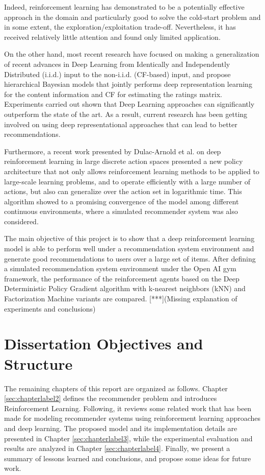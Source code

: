 Indeed, reinforcement learning has demonstrated to be a potentially effective approach in the domain and particularly good to solve the cold-start problem and in some extent, the exploration/exploitation trade-off\cite{shani2005mdp}. Nevertheless, it has received relatively little attention and found only limited application.

On the other hand, most recent research\cite{wang2015collaborative} have focused on making a generalization of recent advances in Deep Learning\cite{bengio2013representation} from Identically and Independently Distributed (i.i.d.) input to the non-i.i.d. (CF-based) input, and propose hierarchical Bayesian models that jointly performs deep representation learning for the content information and CF for estimating the ratings matrix. Experiments carried out shown that Deep Learning approaches can significantly outperform the state of the art. As a result, current research has been getting involved on using deep representational approaches that can lead to better recommendations.

Furthermore, a recent work presented by Dulac-Arnold et al. on deep reinforcement learning in large discrete action spaces\cite{Dulac-Arnold2015} presented a new policy architecture that not only allows reinforcement learning methods to be applied to large-scale learning problems, and to operate efficiently with a large number of actions, but also can generalize over the action set in logarithmic time. This algorithm showed to a promising convergence of the model among different continuous environments, where a simulated recommender system was also considered.

The main objective of this project is to show that a deep reinforcement learning model is able to perform well under a recommendation system environment and generate good recommendations to users over a large set of items. After defining a simulated recommendation system environment under the Open AI gym framework, the performance of the reinforcement agents based on the Deep Deterministic Policy Gradient algorithm with k-nearest neighbors (kNN) and Factorization Machine variants are compared. [***](Missing explanation of experiments and conclusions)

\section{Dissertation Objectives and Structure}

The remaining chapters of this report are organized as follows. Chapter \ref{sec:chapterlabel2} defines the recommender problem and introduces Reinforcement Learning. Following, it reviews some related work that has been made for modeling recommender systems using reinforcement learning approaches and deep learning. The proposed model and its implementation details are presented in Chapter \ref{sec:chapterlabel3}, while the experimental evaluation and results are analyzed in Chapter \ref{sec:chapterlabel4}. Finally, we present a summary of lessons learned and conclusions, and propose some ideas for future work.


